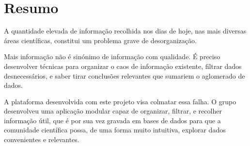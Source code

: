 \section*{Resumo}

A quantidade elevada de informação recolhida nos dias de hoje, nas mais diversas áreas científicas, constitui um problema grave de desorganização.

Mais informação não é sinónimo de informação com qualidade. É preciso desenvolver técnicas para organizar o caos de informação existente, filtrar dados desnecessários, e saber tirar conclusões relevantes que sumariem o aglomerado de dados.

\bigskip

A plataforma desenvolvida com este projeto visa colmatar essa falha. O grupo desenvolveu uma aplicação modular capaz de organizar, filtrar, e recolher informação útil, que é por sua vez gravada em bases de dados para que a comunidade científica possa, de uma forma muito intuitiva, explorar dados convenientes e relevantes.

\newpage
